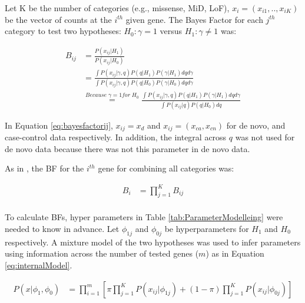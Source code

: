 \documentclass[]{article}
\begin{document}
Let K be the number of categories (e.g., missense, MiD, LoF), $x_i =
(x_{i1}, .., x_{iK})$ be the vector of counts at the $i^{th}$ given
gene. The Bayes Factor for each $j^{th}$ category to test two hypotheses: $H_0: \gamma = 1$ versus $H_1:
\gamma \neq 1$ was:

\begin{equation}
\begin{array}{ll}
B_{ij} & = \frac{P(x_{ij}|H_1)}{P(x_{ij}|H_0)} \\
 & = \frac{\int P(x_{ij}|\gamma, q)P(q|H_1)P(\gamma|H_1) dq d\gamma}{\int P(x_{ij}|\gamma, q)P(q|H_0)P(\gamma|H_0) dq d\gamma} \\
 & \stackrel{Because\; \gamma = 1 for\; H_{0}}{=} \frac{\int P(x_{ij}|\gamma, q)P(q|H_1)P(\gamma|H_1) dq d\gamma}{\int P(x_{ij}| q)P(q|H_0)dq}
\end{array}
\label{eq:bayesfactorij}
\end{equation}

In Equation \ref{eq:bayesfactorij}, $x_{ij} = x_d$ and $x_{ij} =
(x_{ca}, x_{cn})$  for de novo, and  case-control data
respectively. In addition, the integral across $q$ was not used for de
novo data because there was not this parameter in de novo data.

As in \cite{he2013integrated}, the BF for the $i^{th}$ gene for combining all categories was:

\begin{equation}
\begin{array}{ll}
B_{i} & =  \prod \limits_{j=1}^{K} B_{ij} \\
\end{array}
\label{eq:bayesfactors}
\end{equation}




To calculate BFs, hyper parameters in Table \ref{tab:ParameterModelleing} were needed to know in advance.
Let $\phi_{1j}$ and $\phi_{0j}$ be hyperparameters for $H_1$ and $H_0$ respectively.
A mixture model of the two hypotheses was used to infer
parameters using information across the number of tested genes ($m$) as
in Equation \ref{eq:internalModel}.

\begin{equation} \label{eq:internalModel}
\begin{array}{ll}
P(x|\phi_1, \phi_0) & = \prod \limits_{i=1}^{m} \left[ \pi \prod \limits_{j=1}^{K} P(x_{ij}|\phi_{1j}) + (1 - \pi) \prod \limits_{j=1}^{K} P(x_{ij}|\phi_{0j}) \right] \\
\end{array}
\end{equation}
\end{document}
